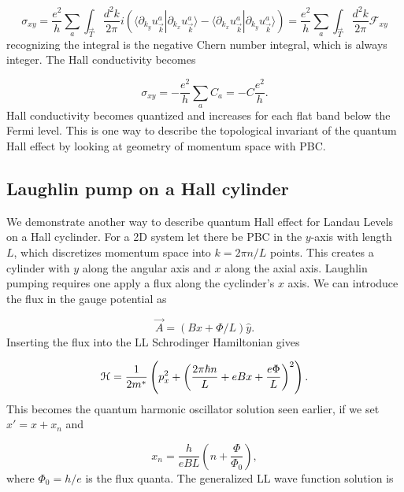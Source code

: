 \begin{equation}
  \sigma_{xy} = \dfrac{e^2}{h} \sum_{a} \int_{\vec{T}} \dfrac{d^2k}{2\pi} i\left(\langle \partial_{k_y} u_{\vec{k}}^a | \partial_{k_x} u_{\vec{k}}^a \rangle - \langle \partial_{k_x} u_{\vec{k}}^a | \partial_{k_y} u_{\vec{k}}^a \rangle \right) = \dfrac{e^2}{h} \sum_{a} \int_{\vec{T}} \dfrac{d^2k}{2\pi} \mathcal{F}_{xy}
\end{equation}
recognizing the integral is the negative Chern number integral, which is always integer.
The Hall conductivity becomes

\begin{equation}
  \sigma_{xy} = -\dfrac{e^2}{h} \sum_a C_a = -C \dfrac{e^2}{h}.
\end{equation}
Hall conductivity becomes quantized and increases for each flat band below the Fermi level.
This is one way to describe the topological invariant of the quantum Hall effect by looking at geometry of momentum space with PBC.

\subsection{Laughlin pump on a Hall cylinder}
We demonstrate another way to describe quantum Hall effect for Landau Levels on a Hall cyclinder.
For a 2D system let there be PBC in the $y$-axis with length $L$, which discretizes momentum space into $k = 2\pi n/ L$ points.
This creates a cylinder with $y$ along the angular axis and $x$ along the axial axis.
Laughlin pumping requires one apply a flux along the cyclinder's $x$ axis.
We can introduce the flux in the gauge potential as

\begin{equation}
  \vec{A} = (Bx + \Phi/L)\hat{y}.
\end{equation}
Inserting the flux into the LL Schrodinger Hamiltonian gives

\begin{equation}
  \mathcal{H} = \dfrac{1}{2m^*} \left( p_x^2 + {\left(\dfrac{2\pi \hbar n}{L} + eBx + \dfrac{e\Phi}{L} \right)}^2\right).
\end{equation}
This becomes the quantum harmonic oscillator solution seen earlier, if we set $x' = x + x_n$ and

\begin{equation} \label{eq:xCM}
  x_n = \dfrac{h}{eBL} \left(n + \dfrac{\Phi}{\Phi_0} \right),
\end{equation}
where $\Phi_0 = h/e$ is the flux quanta.
The generalized LL wave function solution is

